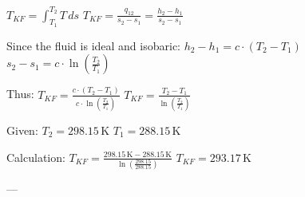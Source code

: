 \( T_{KF} = \int_{T_1}^{T_2} T \, ds \)  
\( T_{KF} = \frac{q_{12}}{s_2 - s_1} = \frac{h_2 - h_1}{s_2 - s_1} \)  

Since the fluid is ideal and isobaric:  
\( h_2 - h_1 = c \cdot (T_2 - T_1) \)  
\( s_2 - s_1 = c \cdot \ln \left( \frac{T_2}{T_1} \right) \)  

Thus:  
\( T_{KF} = \frac{c \cdot (T_2 - T_1)}{c \cdot \ln \left( \frac{T_2}{T_1} \right)} \)  
\( T_{KF} = \frac{T_2 - T_1}{\ln \left( \frac{T_2}{T_1} \right)} \)  

Given:  
\( T_2 = 298.15 \, \text{K} \)  
\( T_1 = 288.15 \, \text{K} \)  

Calculation:  
\( T_{KF} = \frac{298.15 \, \text{K} - 288.15 \, \text{K}}{\ln \left( \frac{298.15}{288.15} \right)} \)  
\( T_{KF} = 293.17 \, \text{K} \)  

---